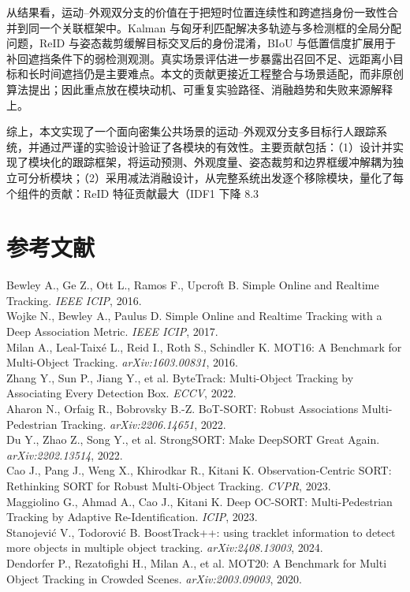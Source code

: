 \documentclass[UTF8,a4paper,10pt]{ctexart}
\begin{document}
从结果看，运动--外观双分支的价值在于把短时位置连续性和跨遮挡身份一致性合并到同一个关联框架中。Kalman 与匈牙利匹配解决多轨迹与多检测框的全局分配问题，ReID 与姿态裁剪缓解目标交叉后的身份混淆，BIoU 与低置信度扩展用于补回遮挡条件下的弱检测观测。真实场景评估进一步暴露出召回不足、远距离小目标和长时间遮挡仍是主要难点。本文的贡献更接近工程整合与场景适配，而非原创算法提出；因此重点放在模块动机、可重复实验路径、消融趋势和失败来源解释上。

综上，本文实现了一个面向密集公共场景的运动--外观双分支多目标行人跟踪系统，并通过严谨的实验设计验证了各模块的有效性。主要贡献包括：（1）设计并实现了模块化的跟踪框架，将运动预测、外观度量、姿态裁剪和边界框缓冲解耦为独立可分析模块；（2）采用减法消融设计，从完整系统出发逐个移除模块，量化了每个组件的贡献：ReID 特征贡献最大（IDF1 下降 8.3%

\section*{参考文献}
\noindent [1] Bewley A., Ge Z., Ott L., Ramos F., Upcroft B. Simple Online and Realtime Tracking. \textit{IEEE ICIP}, 2016.\\
[2] Wojke N., Bewley A., Paulus D. Simple Online and Realtime Tracking with a Deep Association Metric. \textit{IEEE ICIP}, 2017.\\
[3] Milan A., Leal-Taixé L., Reid I., Roth S., Schindler K. MOT16: A Benchmark for Multi-Object Tracking. \textit{arXiv:1603.00831}, 2016.\\
[4] Zhang Y., Sun P., Jiang Y., et al. ByteTrack: Multi-Object Tracking by Associating Every Detection Box. \textit{ECCV}, 2022.\\
[5] Aharon N., Orfaig R., Bobrovsky B.-Z. BoT-SORT: Robust Associations Multi-Pedestrian Tracking. \textit{arXiv:2206.14651}, 2022.\\
[6] Du Y., Zhao Z., Song Y., et al. StrongSORT: Make DeepSORT Great Again. \textit{arXiv:2202.13514}, 2022.\\
[7] Cao J., Pang J., Weng X., Khirodkar R., Kitani K. Observation-Centric SORT: Rethinking SORT for Robust Multi-Object Tracking. \textit{CVPR}, 2023.\\
[8] Maggiolino G., Ahmad A., Cao J., Kitani K. Deep OC-SORT: Multi-Pedestrian Tracking by Adaptive Re-Identification. \textit{ICIP}, 2023.\\
[9] Stanojević V., Todorović B. BoostTrack++: using tracklet information to detect more objects in multiple object tracking. \textit{arXiv:2408.13003}, 2024.\\
[10] Dendorfer P., Rezatofighi H., Milan A., et al. MOT20: A Benchmark for Multi Object Tracking in Crowded Scenes. \textit{arXiv:2003.09003}, 2020.
\end{document}
